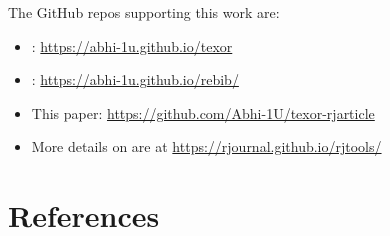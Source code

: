 The GitHub repos supporting this work are:

\begin{itemize}
\tightlist
\item
  : \url{https://abhi-1u.github.io/texor}
\item
  : \url{https://abhi-1u.github.io/rebib/}
\item
  This paper: \url{https://github.com/Abhi-1U/texor-rjarticle}
\item
  More details on  are at \url{https://rjournal.github.io/rjtools/}
\end{itemize}

\hypertarget{references}{%
\section*{References}\label{references}}

